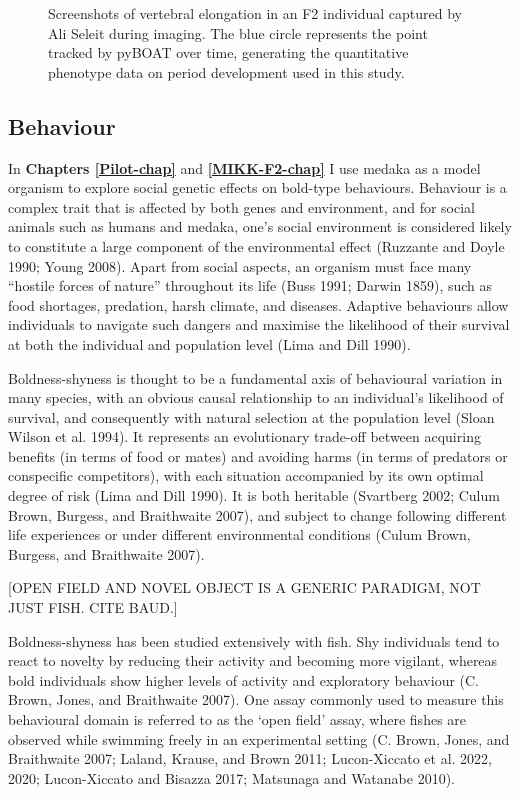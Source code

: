 \documentclass[
]{book}
\begin{document}
\begin{figure}
\caption{Screenshots of vertebral elongation in an F2 individual captured by Ali Seleit during imaging. The blue circle represents the point tracked by pyBOAT over time, generating the quantitative phenotype data on period development used in this study.}\label{fig:somite-period-ali}
\end{figure}

\hypertarget{behaviour}{%
\subsection{Behaviour}\label{behaviour}}

In \textbf{Chapters \ref{Pilot-chap}} and \textbf{\ref{MIKK-F2-chap}} I use medaka as a model organism to explore social genetic effects on bold-type behaviours. Behaviour is a complex trait that is affected by both genes and environment, and for social animals such as humans and medaka, one's social environment is considered likely to constitute a large component of the environmental effect (Ruzzante and Doyle 1990; Young 2008). Apart from social aspects, an organism must face many ``hostile forces of nature'' throughout its life (Buss 1991; Darwin 1859), such as food shortages, predation, harsh climate, and diseases. Adaptive behaviours allow individuals to navigate such dangers and maximise the likelihood of their survival at both the individual and population level (Lima and Dill 1990).

Boldness-shyness is thought to be a fundamental axis of behavioural variation in many species, with an obvious causal relationship to an individual's likelihood of survival, and consequently with natural selection at the population level (Sloan Wilson et al. 1994). It represents an evolutionary trade-off between acquiring benefits (in terms of food or mates) and avoiding harms (in terms of predators or conspecific competitors), with each situation accompanied by its own optimal degree of risk (Lima and Dill 1990). It is both heritable (Svartberg 2002; Culum Brown, Burgess, and Braithwaite 2007), and subject to change following different life experiences or under different environmental conditions (Culum Brown, Burgess, and Braithwaite 2007).

{[}OPEN FIELD AND NOVEL OBJECT IS A GENERIC PARADIGM, NOT JUST FISH. CITE BAUD.{]}

Boldness-shyness has been studied extensively with fish. Shy individuals tend to react to novelty by reducing their activity and becoming more vigilant, whereas bold individuals show higher levels of activity and exploratory behaviour (C. Brown, Jones, and Braithwaite 2007). One assay commonly used to measure this behavioural domain is referred to as the `open field' assay, where fishes are observed while swimming freely in an experimental setting (C. Brown, Jones, and Braithwaite 2007; Laland, Krause, and Brown 2011; Lucon-Xiccato et al. 2022, 2020; Lucon-Xiccato and Bisazza 2017; Matsunaga and Watanabe 2010).
\end{document}
